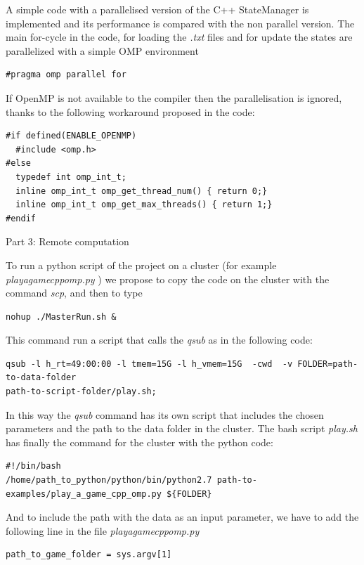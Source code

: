\documentclass[11pt, twoside]{article}
\begin{document}
A simple code with a parallelised version of the C++ StateManager is implemented and its performance is compared with the non parallel version. The main for-cycle in the code, for loading the \emph{.txt} files and for update the states are parallelized with a simple OMP environment
\begin{verbatim}
#pragma omp parallel for
\end{verbatim}
If OpenMP is not available to the compiler then the parallelisation is ignored, thanks to the following workaround proposed in the code:
\begin{verbatim}
#if defined(ENABLE_OPENMP)
  #include <omp.h>
#else
  typedef int omp_int_t;
  inline omp_int_t omp_get_thread_num() { return 0;}
  inline omp_int_t omp_get_max_threads() { return 1;}
#endif
\end{verbatim}


\begin{center}
	\color{MidnightBlue} {\Large Part 3: Remote computation}\color{Black} 
\end{center}
\noindent
To run a python script of the project on a cluster (for example \emph{play\textunderscore a\textunderscore game\textunderscore cpp\textunderscore omp.py} ) we propose to copy the code on the cluster with the command \emph{scp}, and then to type
\begin{verbatim}
nohup ./MasterRun.sh &
\end{verbatim}
This command run a script that calls the \emph{qsub} as in the following code:
\begin{verbatim}
qsub -l h_rt=49:00:00 -l tmem=15G -l h_vmem=15G  -cwd  -v FOLDER=path-to-data-folder
path-to-script-folder/play.sh;
\end{verbatim}
In this way the \emph{qsub} command has its own script that includes the chosen parameters and the path to the data folder in the cluster.
The bash script \emph{play.sh} has finally the command for the cluster with the python code:
\begin{verbatim}
#!/bin/bash
/home/path_to_python/python/bin/python2.7 path-to-examples/play_a_game_cpp_omp.py ${FOLDER}
\end{verbatim}
And to include the path with the data as an input parameter, we have to add the following line in the file \emph{play\textunderscore a\textunderscore game\textunderscore cpp\textunderscore omp.py}
\begin{verbatim}
path_to_game_folder = sys.argv[1]
\end{verbatim}
\end{document}
